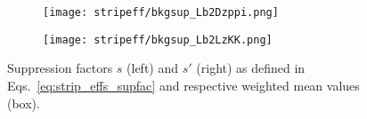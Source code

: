 \begin{figure}[htbp]
    \centering
    \begin{subfigure}{.49\textwidth}
        \centering
        \texttt{[image: stripeff/bkgsup\_Lb2Dzppi.png]}
    \end{subfigure}
    \begin{subfigure}{.49\textwidth}
        \centering
        \texttt{[image: stripeff/bkgsup\_Lb2LzKK.png]}
    \end{subfigure}
    \caption{Suppression factors $s$ (left) and $s'$ (right) as defined in Eqs.~\eqref{eq:strip_effs_supfac} and respective weighted mean values (box).}
    \label{fig:stripeff_bkgsups}
\end{figure}

